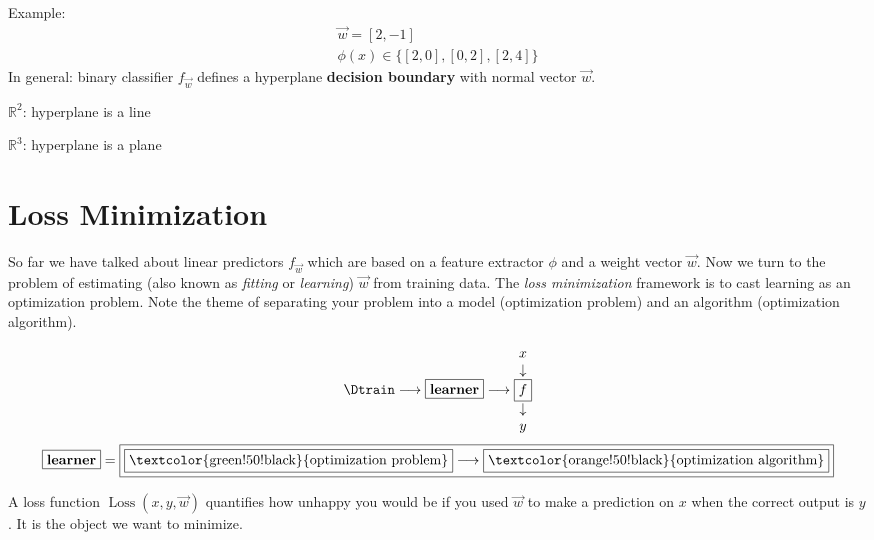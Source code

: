 \begin{example}
    Example:
    \begin{gather*}     
        \vec{w} = [2,-1]\\
        \phi(x) \in \{[2,0],[0,2],[2,4]\}
    \end{gather*}
    In general: binary classifier $f_{\vec{w}}$ defines a hyperplane \textbf{decision boundary} with normal vector $\vec{w}$.

    $\mathbb{R}^2$: hyperplane is a line

    $\mathbb{R}^3$: hyperplane is a plane
\end{example}




\section{Loss Minimization} %
\label{sec:loss_minimization}
So far we have talked about linear predictors $f_{\vec{w}}$ which are based on a feature extractor $\phi$ and a weight vector $\vec{w}$.
Now we turn to the problem of estimating (also known as \textit{fitting} or \textit{learning}) $\vec{w}$ from training data.
The \textit{loss minimization} framework is to cast learning as an optimization problem.
Note the theme of separating your problem into a model (optimization problem) and an algorithm (optimization algorithm).

\begin{gather*}
    \Dtrain \longrightarrow \boxed{\textbf{learner}} \longrightarrow \begin{matrix}x \\ \downarrow \\ \boxed{f} \\ \downarrow \\ y\end{matrix}
\end{gather*}
\begin{gather*}
    \boxed{\textbf{learner}} = \boxed{\boxed{\text{\textcolor{green!50!black}{optimization problem}}} \longrightarrow \boxed{\text{\textcolor{orange!50!black}{optimization algorithm}}}}
\end{gather*}

\begin{example}
     A loss function $\operatorname{Loss}(x,y,\vec{w})$ quantifies how unhappy you would be if you used $\vec{w}$ to make a prediction on $x$ when the correct output is $y$. It is the object we want to minimize.
\end{example}

